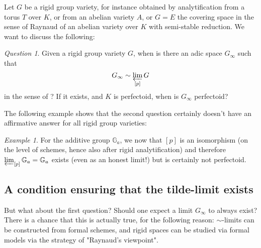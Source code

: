 \documentclass[11pt,oneside]{amsart}
\theoremstyle{definition}
\theoremstyle{remark}
\newtheorem*{example}{Example}
\newtheorem*{question}{Question}
\begin{document}
	Let $G$ be a rigid group variety, for instance obtained by analytification from a torus $T$ over $K$, or from an abelian variety $A$, or $G=E$ the covering space in the sense of Raynaud of an abelian variety over $K$ with semi-stable reduction. We want to discuss the following:
	
	\begin{framed}
	\begin{question}
		Given a rigid group variety $G$, when is there an adic space $G_\infty$ such that \[G_\infty \sim  \varprojlim_{[p]} G\] in the sense of \cite{SW}? If it exists, and $K$ is perfectoid, when is $G_\infty$ perfectoid?
	\end{question}
	\end{framed}
	
	The following example shows that the second question certainly doesn't have an affirmative answer for all rigid group varieties:
	\begin{example}
		For the additive group $\mathbb G_a$, we now that $[p]$ is an isomorphism (on the level of schemes, hence also after rigid analytification) and therefore $\varprojlim_{[p]} \mathbb G_a=\mathbb G_a$ exists (even as an honest limit!) but is certainly not perfectoid.
	\end{example}
	\subsection{A condition ensuring that the tilde-limit exists}
	But what about the first question? Should one expect a limit $G_\infty$ to always exist? There is a chance that this is actually true, for the following reason: $\sim$-limits can be constructed from formal schemes, and rigid spaces can be studied via formal models via the strategy of "Raynaud's viewpoint".
	
\end{document}
